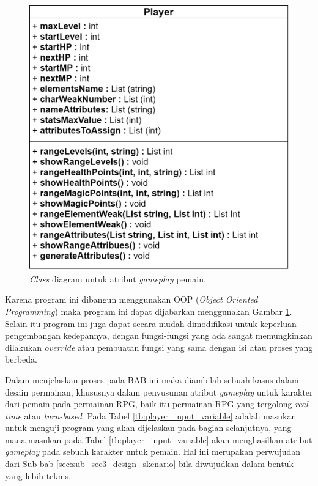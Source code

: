 \begin{figure} [!h] \centering
	\includegraphics[scale=0.2]{img/player_uml.png}
	\caption{\textit{Class} diagram untuk atribut \textit{gameplay} pemain.}
	\label{fig:player_uml}
\end{figure}

Karena program ini dibangun menggunakan OOP (\textit{Object Oriented Programming}) maka program ini dapat dijabarkan menggunakan Gambar \ref{fig:player_uml}. Selain itu program ini juga dapat secara mudah dimodifikasi untuk keperluan pengembangan kedepannya, dengan fungsi-fungsi yang ada sangat memungkinkan dilakukan \textit{override} atau pembuatan fungsi yang sama dengan isi atau proses yang berbeda.
\vspace{1ex}

Dalam menjelaskan proses pada BAB ini maka diambilah sebuah kasus dalam desain permainan, khususnya dalam penyusunan atribut \textit{gameplay} untuk karakter dari pemain pada permainan RPG, baik itu permainan RPG yang tergolong \textit{real-time} atau \textit{turn-based}. Pada Tabel \ref{tb:player_input_variable} adalah masukan untuk menguji program yang akan dijelaskan pada bagian selanjutnya, yang mana masukan pada Tabel \ref{tb:player_input_variable} akan menghasilkan atribut \textit{gameplay} pada sebuah karakter untuk pemain. Hal ini merupakan perwujudan dari Sub-bab \ref{sec:sub_sec3_design_skenario} bila diwujudkan dalam bentuk yang lebih teknis.
\vspace{-1ex}

